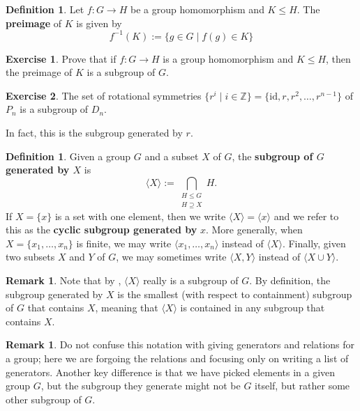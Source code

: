 \documentclass[12pt]{report}
\numberwithin{equation}{section}
\numberwithin{theorem}{chapter}
\theoremstyle{definition}
\newtheorem{definition}[theorem]{Definition}
\newtheorem{exercise}{Exercise}
\newtheorem*{basic properties}{Basic Properties}
\newtheorem*{Important Remark}{Important Remark}
\newtheorem{remark}[theorem]{Remark}
\begin{document}
\begin{definition}
Let $f\!:G\to H$ be a group homomorphism and $K\leq H$. The {\bf preimage} of $K$ is given by
$$f^{-1}(K) := \{g\in G \mid f(g)\in K\}$$
\end{definition}


\begin{exercise}\label{preimage is a subgroup}
Prove that if $f\!:G\to H$ is a group homomorphism and $K\leq H$, then the preimage of $K$ is a subgroup of $G$.
\end{exercise}




\begin{exercise}\label{rotations subgroup of D_n}
	The set of rotational symmetries $\{ r^i \mid i \in \mathbb{Z} \} = \{\mathrm{id}, r, r^2, \dots, r^{n-1}\}$ of $P_n$ is a subgroup of $D_{n}$.
\end{exercise}


In fact, this is the subgroup generated by $r$.


\begin{definition}
Given a group $G$ and a subset $X$ of $G$, the {\bf subgroup of $G$ generated by $X$} is
$$\langle X \rangle := \bigcap_{\substack{H \leq G \\ H \supseteq X}} H.$$
If $X=\{x\}$ is a set with one element, then we write $\langle X \rangle=\langle x \rangle$ and we refer to this as the {\bf cyclic subgroup generated by} $x$. More generally, when $X = \{ x_1, \ldots, x_n \}$ is finite, we may write $\langle x_1, \ldots, x_n \rangle$ instead of $\langle X \rangle$. Finally, given two subsets $X$ and $Y$ of $G$, we may sometimes write $\langle X, Y \rangle$ instead of $\langle X \cup Y \rangle$.
\end{definition}


\begin{remark}
Note that by , $\langle X \rangle$ really is a subgroup of $G$. By definition, the subgroup generated by $X$ is the smallest (with respect to containment) subgroup of $G$ that contains $X$, meaning that $\langle X \rangle$ is contained in any subgroup that contains $X$.
\end{remark}


\begin{remark}
	Do not confuse this notation with giving generators and relations for a group; here we are forgoing the relations and focusing only on writing a list of generators. Another key difference is that we have picked elements in a given group $G$, but the subgroup they generate might not be $G$ itself, but rather some other subgroup of $G$.
\end{remark}
\end{document}
